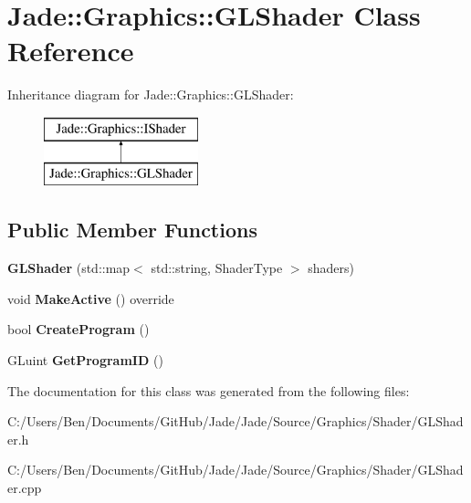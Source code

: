 \hypertarget{class_jade_1_1_graphics_1_1_g_l_shader}{}\section{Jade\+:\+:Graphics\+:\+:G\+L\+Shader Class Reference}
\label{class_jade_1_1_graphics_1_1_g_l_shader}
Inheritance diagram for Jade\+:\+:Graphics\+:\+:G\+L\+Shader\+:\begin{figure}[H]
\begin{center}
\leavevmode
\includegraphics[height=2.000000cm]{class_jade_1_1_graphics_1_1_g_l_shader}
\end{center}
\end{figure}
\subsection*{Public Member Functions}
\begin{DoxyCompactItemize}
\item 
\hypertarget{class_jade_1_1_graphics_1_1_g_l_shader_a4e7462f54e22652e40a910097ad2b17a}{}{\bfseries G\+L\+Shader} (std\+::map$<$ std\+::string, Shader\+Type $>$ shaders)\label{class_jade_1_1_graphics_1_1_g_l_shader_a4e7462f54e22652e40a910097ad2b17a}

\item 
\hypertarget{class_jade_1_1_graphics_1_1_g_l_shader_abf8811459d63ee31539fdfa5b3540308}{}void {\bfseries Make\+Active} () override\label{class_jade_1_1_graphics_1_1_g_l_shader_abf8811459d63ee31539fdfa5b3540308}

\item 
\hypertarget{class_jade_1_1_graphics_1_1_g_l_shader_a30aa4325170d2a40e3abcaaf6a0fe669}{}bool {\bfseries Create\+Program} ()\label{class_jade_1_1_graphics_1_1_g_l_shader_a30aa4325170d2a40e3abcaaf6a0fe669}

\item 
\hypertarget{class_jade_1_1_graphics_1_1_g_l_shader_abd666a42d2c53a7efc529c4346094426}{}G\+Luint {\bfseries Get\+Program\+I\+D} ()\label{class_jade_1_1_graphics_1_1_g_l_shader_abd666a42d2c53a7efc529c4346094426}

\end{DoxyCompactItemize}


The documentation for this class was generated from the following files\+:\begin{DoxyCompactItemize}
\item 
C\+:/\+Users/\+Ben/\+Documents/\+Git\+Hub/\+Jade/\+Jade/\+Source/\+Graphics/\+Shader/G\+L\+Shader.\+h\item 
C\+:/\+Users/\+Ben/\+Documents/\+Git\+Hub/\+Jade/\+Jade/\+Source/\+Graphics/\+Shader/G\+L\+Shader.\+cpp\end{DoxyCompactItemize}
